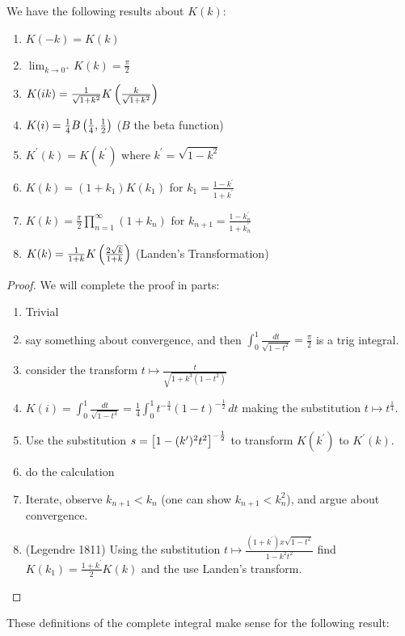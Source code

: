 \documentclass{article}
\begin{document}
\begin{prop}
	We have the following results about $K(k)$:
	\begin{enumerate}
		\item $K(-k) = K(k)$
		\item $\lim_{k \to 0^+} K(k) = \frac{\pi}{2}$
		\item $K(ik) = \frac{1}{\sqrt{1+k^2}}K\left( \frac{k}{\sqrt{1+k^2}} \right)$
		\item $K(i) = \frac{1}{4}B\left( \frac{1}{4},\frac{1}{2} \right)$ ($B$ the beta function)
		\item $K^\prime(k) = K(k^\prime)$ where $k^\prime = \sqrt{1-k^2}$
		\item $K(k) = (1+k_1) K(k_1)$ for $k_1 = \frac{1-k^\prime}{1+k^\prime}$
		\item $K(k) = \frac{\pi}{2} \prod_{n=1}^\infty (1+k_n)$ for $k_{n+1} = \frac{1-k_n^\prime}{1+k_n^\prime}$
		\item 	$K(k)  = \frac{1}{1+k} K \left( \frac{2\sqrt{k}}{1+k} \right)$ (Landen's Transformation)
	\end{enumerate}
\end{prop}
\begin{proof}
	We will complete the proof in parts:
	\begin{enumerate}
		\item Trivial 
		\item say something about convergence, and then $\int_0^1 \frac{dt}{\sqrt{1-t^2}} = \frac{\pi}{2}$ is a trig integral. 
		\item  consider the transform $	t \mapsto \frac{t}{\sqrt{1+k^3(1-t^2)}}$
		\item $K(i) = \int_0^1 \frac{dt}{\sqrt{1-t^4}} = \frac{1}{4} \int_0^1 t^{-\frac{3}{4}}(1-t)^{-\frac{1}{2}} \, dt$ making the substitution $t\mapsto t^\frac{1}{4}$.
		\item Use the substitution $s = \left[ 1-(k^\prime)^2 t^2 \right]^{-\frac{1}{2}}$ to transform $K(k^\prime)$ to $K^\prime(k)$.
		\item do the calculation
		\item Iterate, observe $k_{n+1} < k_n$ (one can show $k_{n+1}<k_n^2$), and argue about convergence. 
		\item (Legendre 1811) Using the substitution $t \mapsto \frac{(1+k^\prime)x\sqrt{1-t^2}}{1-k^2 t^2}$ find $K(k_1) = \frac{1+k^\prime}{2}K(k)$ and the use Landen's transform.  
	\end{enumerate}
\end{proof}


These definitions of the complete integral make sense for the following result:
\end{document}
